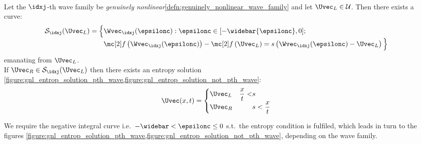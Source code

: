 \begin{lemmabox}\nospacing
    \begin{lemma}\label{lemma:lax_entropy_solution}\leavevmode\\
        Let the $\idxj$-th wave family be \textit{genuinely nonlinear}\cref{defn:genuinely_nonlinear_wave_family} and let $\Uvec_{L}\in\admissibleset$.
        Then there exists a curve:
        \begin{align}
          \mathcal{S}_{\idxj}(\Uvec_{L})=\Big\{&\Wvec_{\idxj}(\epsilonc):\epsilonc\in[-\widebar{\epsilonc},0];\\[-1\jot]
          &\flux\left(\Wvec_{\idxj}(\epsilonc)\right)-\flux\left(\Uvec_{L}\right)=s \left(\Wvec_{\idxj}(\epsilonc)-\Uvec_{L}\right)\Big\}\label{eq:lax_entropy_contact_solution}
        \end{align}
        emanating from $\Uvec_{L}$.\\
        If $\Uvec_{R}\in\mathcal{S}_{\idxj}(\Uvec_{L})$ then there exists an entropy solution
        \cref{figure:gnl_entrop_solution_pth_wave,figure:gnl_entrop_solution_not_pth_wave}:
        \begin{align}
          \Uvec(x,t)=
          \left\{\begin{alignedat}{5}
              &\Uvec_{L}&\quad&\frac{x}{t}<&&s \\[-1\jot]
              &\Uvec_{R}&&&&s<\frac{x}{t}
          \end{alignedat}\right.
        \end{align}
    \end{lemma}
\end{lemmabox}
\begin{explanationbox}\nospacing
    \begin{explanation}
        We require the negative integral curve i.e.\ $-\widebar<\epsilonc\leq 0$ s.t.\ the entropy condition is fulfiled, which
        leads in turn to the figures \cref{figure:gnl_entrop_solution_pth_wave,figure:gnl_entrop_solution_not_pth_wave}, depending on the wave family.
    \end{explanation}
\end{explanationbox}
